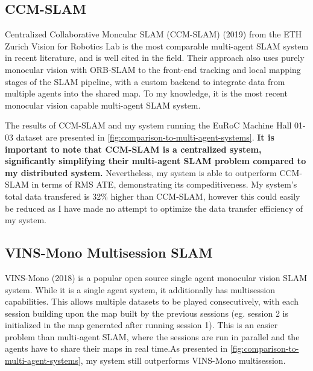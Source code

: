 \subsection{CCM-SLAM}
\label{sec:ccm-slam}
Centralized Collaborative Moncular SLAM (CCM-SLAM) (2019) from the ETH Zurich Vision for Robotics Lab \autocite{schmuck2019ccm} is the most comparable multi-agent SLAM system in recent literature, and is well cited in the field. Their approach also uses purely monocular vision with ORB-SLAM to the front-end tracking and local mapping stages of the SLAM pipeline, with a custom backend to integrate data from multiple agents into the shared map. To my knowledge, it is the most recent monocular vision capable multi-agent SLAM system.

The results of CCM-SLAM and my system running the EuRoC Machine Hall 01-03 dataset are presented in \autoref{fig:comparison-to-multi-agent-systems}. \textbf{It is important to note that CCM-SLAM is a centralized system, significantly simplifying their multi-agent SLAM problem compared to my distributed system.} Nevertheless, my system is able to outperform CCM-SLAM in terms of RMS ATE, demonstrating its compeditiveness. My system's total data transfered is 32\% higher than CCM-SLAM, however this could easily be reduced as I have made no attempt to optimize the data transfer efficiency of my system.

\subsection{VINS-Mono Multisession SLAM}
VINS-Mono (2018) \autocite{8421746} is a popular open source single agent monocular vision SLAM system. While it is a single agent system, it additionally has multisession capabilities. This allows multiple datasets to be played consecutively, with each session building upon the map built by the previous sessions (eg. session 2 is initialized in the map generated after running session 1). This is an easier problem than multi-agent SLAM, where the sessions are run in parallel and the agents have to share their maps in real time.As presented in \autoref{fig:comparison-to-multi-agent-systems}, my system still outperforms VINS-Mono multisession.

